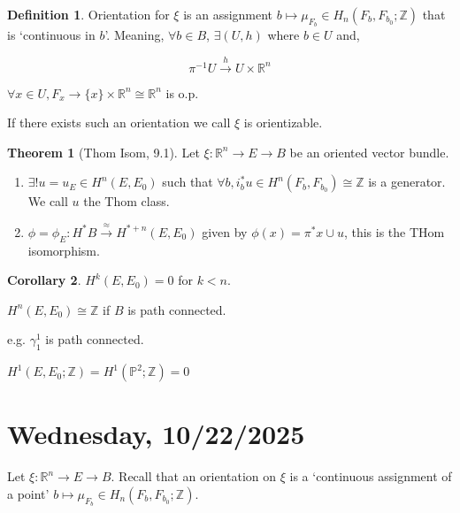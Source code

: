 \documentclass{article}
\theoremstyle{definition}
\newtheorem*{definition}{Definition}
\newtheorem{theorem}{Theorem}
\newtheorem{corollary}[theorem]{Corollary}
\begin{document}
    \begin{definition}
        Orientation for \(\xi\) is an assignment \(b \mapsto \mu_{F_b} \in H_n(F_b , F_{b_0} ; \mathbb{Z})\) that is `continuous in \(b\)'. Meaning, \(\forall b \in B\), \(\exists (U, h)\) where \(b\in U\) and,
        
        \[
            \pi ^{-1} U \xrightarrow{h} U \times \mathbb{R}^n
        \]

        \(\forall x\in U, F_x \to \{ x \} \times \mathbb{R}^n \cong \mathbb{R}^n\) is o.p.
    \end{definition}

    If there exists such an orientation we call \(\xi\) is orientizable.

    \begin{theorem}
        [Thom Isom, 9.1] Let \(\xi: \mathbb{R}^n \to E \to B\) be an oriented vector bundle.

        \begin{enumerate}[label=\roman*)]
            \item \(\exists ! u = u_E \in H^n(E,E_0)\) such that \(\forall b, i^{\ast} _b u \in H^n(F_b , F_{b_0}) \cong \mathbb{Z}\) is a generator. We call \(u\) the Thom class.
            \item \(\phi = \phi_E : H^{\ast} B \xrightarrow{\approx} H^{\ast + n} (E, E_0)\) given by \(\phi(x) = \pi ^{\ast} x \cup u\), this is the THom isomorphism.  
        \end{enumerate} 
    \end{theorem}

    \begin{corollary}
        \(H^k(E,E_0) = 0\) for \(k < n\).

        \(H^n(E, E_0) \cong \mathbb{Z}\) if \(B\) is path connected.
        
        e.g. \(\gamma^1_1\) is path connected.

        \(H^1(E,E_0 ; \mathbb{Z}) = H^1(\mathbb{P}^2 ; \mathbb{Z}) = 0\) 
    \end{corollary}

    \section*{Wednesday, 10/22/2025}
    
    Let \(\xi : \mathbb{R}^n \to E \to B\). Recall that an orientation on \(\xi\) is a `continuous assignment of a point' \(b \mapsto \mu_{F_b} \in H_n(F_b , F_{b_0} ; \mathbb{Z})\).
\end{document}
